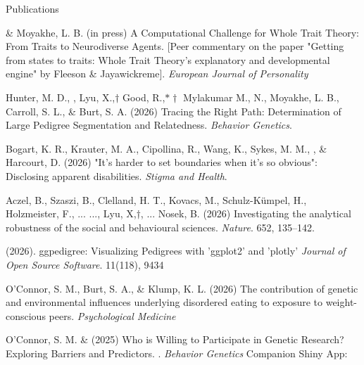 \begin{rSection}{\textrm{Publications}}
\begin{etaremune}
\item \meb \&  Moyakhe, L. B. (in press) A Computational Challenge for Whole Trait Theory: From Traits to Neurodiverse Agents. [Peer commentary on the paper "Getting from states to traits: Whole Trait Theory's explanatory and developmental engine" by Fleeson \& Jayawickreme]. \textit{European Journal of Personality}

\item Hunter, M. D., \meb, Lyu, X.,$\dagger$ Good, R.,$*\dagger$ Mylakumar M., N., Moyakhe, L. B., Carroll, S. L., \& Burt, S. A. (2026) Tracing the Right Path: Determination of Large Pedigree Segmentation and Relatedness. \textit{Behavior Genetics}. 

\item Bogart, K. R., Krauter, M. A., Cipollina, R., Wang, K., Sykes, M. M., \meb, \& Harcourt, D. (2026) "It's harder to set boundaries when it's so obvious": Disclosing apparent disabilities. \textit{Stigma and Health}.  

\item Aczel, B., Szaszi, B., Clelland, H. T., Kovacs, M., Schulz-Kümpel, H., Holzmeister, F., ... \meb ..., Lyu, X,$\dagger$, ... Nosek, B. (2026) Investigating the analytical robustness of the social and behavioural sciences. \textit{Nature}. 652, 135–142. 
\item \meb  (2026). ggpedigree: Visualizing Pedigrees with 'ggplot2' and 'plotly' \textit{Journal of Open Source Software}. 11(118), 9434  
\item O'Connor, S. M., Burt, S. A., \meb \& Klump, K. L. (2026) The contribution of genetic and environmental influences underlying disordered eating to exposure to weight-conscious peers. \textit{Psychological Medicine} 

\item O'Connor, S. M. \& \meb (2025) Who is Willing to Participate in Genetic Research? Exploring Barriers and Predictors. . \textit{Behavior Genetics} \newline
\hspace*{6pt}Companion Shiny App:  


\end{etaremune}
\end{rSection}
